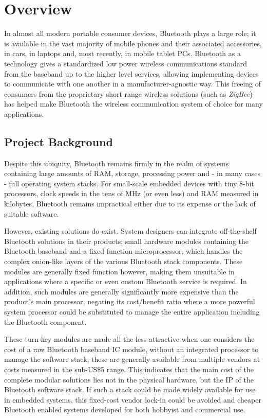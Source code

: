 \chapter{Overview}
\label{Chapter1}

In almost all modern portable consumer devices, Bluetooth plays a large role; it is available in
the vast majority of mobile phones and their associated accessories, in cars, in laptops and, most
recently, in mobile tablet PCs. Bluetooth as a technology gives a standardized low power wireless
communications standard from the baseband up to the higher level services, allowing implementing
devices to communicate with one another in a manufacturer-agnostic way. This freeing of consumers
from the proprietary short range wireless solutions (such as \emph{ZigBee}) has helped make Bluetooth
the wireless communication system of choice for many applications.

\section{Project Background}

Despite this ubiquity, Bluetooth remains firmly in the realm of systems containing large amounts of
RAM, storage, processing power and - in many cases - full operating system stacks. For small-scale
embedded devices with tiny 8-bit processors, clock speeds in the tens of MHz (or even less) and RAM
measured in kilobytes, Bluetooth remains impractical either due to its expense or the lack of suitable
software.

However, existing solutions do exist. System designers can integrate off-the-shelf Bluetooth solutions
in their products; small hardware modules containing the Bluetooth baseband and a fixed-function
microprocessor, which handles the complex onion-like layers of the various Bluetooth stack components.
These modules are generally fixed function however, making them unsuitable in applications where a specific 
or even custom Bluetooth service is required. In addition, such modules are generally significantly more
expensive than the product's main processor, negating its cost/benefit ratio where a more powerful
system processor could be substituted to manage the entire application including the Bluetooth component.

These turn-key modules are made all the less attractive when one considers the cost of a raw Bluetooth
baseband IC module, without an integrated processor to manage the software stack; these are generally
available from multiple vendors at costs measured in the sub-US\$5 range. This indicates that the main cost
of the complete modular solutions lies not in the physical hardware, but the IP of the Bluetooth software
stack. If such a stack could be made widely available for use in embedded systems, this fixed-cost vendor
lock-in could be avoided and cheaper Bluetooth enabled systems developed for both hobbyist and commercial
use.

